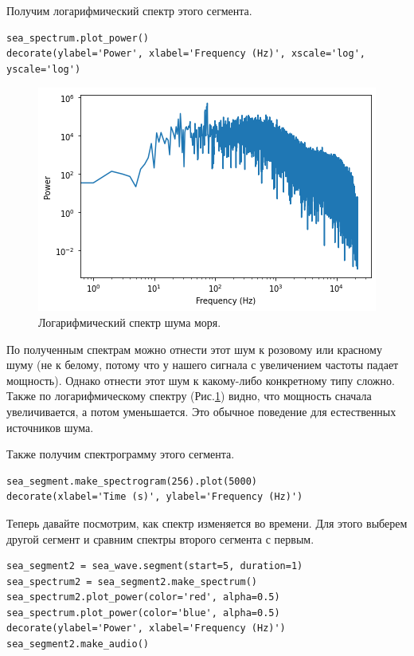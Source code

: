 \documentclass[a4paper, 14pt]{extarticle}
\begin{document}
    Получим логарифмический спектр этого сегмента.

    \begin{lstlisting}[caption= Получение логарифмического спектра., label={lst:task1_sea_spectrum_log}]
sea_spectrum.plot_power()
decorate(ylabel='Power', xlabel='Frequency (Hz)', xscale='log', yscale='log')   \end{lstlisting}

    \begin{figure}[h]
        \centering
        \includegraphics[width=0.8\linewidth]{resources/Images/task1_sea_spectrum_log}
        \caption{Логарифмический спектр шума моря.}
        \label{fig:task1_sea_spectrum_log}
    \end{figure}

    По полученным спектрам можно отнести этот шум к розовому или красному шуму (не к белому, потому что у нашего сигнала
    с увеличением частоты падает мощность). Однако отнести этот шум к какому-либо конкретному типу сложно.
    Также по логарифмическому спектру (Рис.\ref{fig:task1_sea_spectrum_log}) видно, что мощность сначала увеличивается,
    а потом уменьшается. Это обычное поведение для естественных источников шума.

    Также получим спектрограмму этого сегмента.

    \begin{lstlisting}[caption= Получение спектрограммы сегмента., label={lst:task1_sea_spectrum_log}]
sea_segment.make_spectrogram(256).plot(5000)
decorate(xlabel='Time (s)', ylabel='Frequency (Hz)')    \end{lstlisting}

    Теперь давайте посмотрим, как спектр изменяется во времени. Для этого выберем другой сегмент и сравним спектры второго
    сегмента с первым.

    \begin{lstlisting}[caption= Сравнение линейных спектров двух сегментов., label={lst:task1_sea_spectrum_lin_compare}]
sea_segment2 = sea_wave.segment(start=5, duration=1)
sea_spectrum2 = sea_segment2.make_spectrum()
sea_spectrum2.plot_power(color='red', alpha=0.5)
sea_spectrum.plot_power(color='blue', alpha=0.5)
decorate(ylabel='Power', xlabel='Frequency (Hz)')
sea_segment2.make_audio()   \end{lstlisting}
\end{document}
